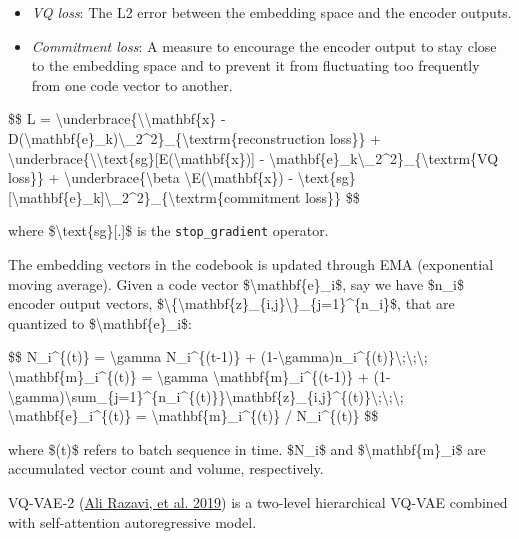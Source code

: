 \begin{itemize}
\tightlist
\item
  \emph{VQ loss}: The L2 error between the embedding space and the encoder outputs.
\item
  \emph{Commitment loss}: A measure to encourage the encoder output to stay close to the embedding space and to prevent it from fluctuating too frequently from one code vector to another.
\end{itemize}

\$\$ L = \textbackslash underbrace\{\textbackslash\textbar\textbackslash mathbf\{x\} - D(\textbackslash mathbf\{e\}\_k)\textbackslash\textbar\_2\^{}2\}\_\{\textbackslash textrm\{reconstruction loss\}\} + \textbackslash underbrace\{\textbackslash\textbar\textbackslash text\{sg\}{[}E(\textbackslash mathbf\{x\}){]} - \textbackslash mathbf\{e\}\_k\textbackslash\textbar\_2\^{}2\}\_\{\textbackslash textrm\{VQ loss\}\} + \textbackslash underbrace\{\textbackslash beta \textbackslash\textbar E(\textbackslash mathbf\{x\}) - \textbackslash text\{sg\}{[}\textbackslash mathbf\{e\}\_k{]}\textbackslash\textbar\_2\^{}2\}\_\{\textbackslash textrm\{commitment loss\}\} \$\$

where \$\textbackslash text\{sg\}{[}.{]}\$ is the \texttt{stop\_gradient} operator.

The embedding vectors in the codebook is updated through EMA (exponential moving average). Given a code vector \$\textbackslash mathbf\{e\}\_i\$, say we have \$n\_i\$ encoder output vectors, \$\textbackslash\{\textbackslash mathbf\{z\}\_\{i,j\}\textbackslash\}\_\{j=1\}\^{}\{n\_i\}\$, that are quantized to \$\textbackslash mathbf\{e\}\_i\$:

\$\$ N\_i\^{}\{(t)\} = \textbackslash gamma N\_i\^{}\{(t-1)\} + (1-\textbackslash gamma)n\_i\^{}\{(t)\}\textbackslash;\textbackslash;\textbackslash; \textbackslash mathbf\{m\}\_i\^{}\{(t)\} = \textbackslash gamma \textbackslash mathbf\{m\}\_i\^{}\{(t-1)\} + (1-\textbackslash gamma)\textbackslash sum\_\{j=1\}\^{}\{n\_i\^{}\{(t)\}\}\textbackslash mathbf\{z\}\_\{i,j\}\^{}\{(t)\}\textbackslash;\textbackslash;\textbackslash; \textbackslash mathbf\{e\}\_i\^{}\{(t)\} = \textbackslash mathbf\{m\}\_i\^{}\{(t)\} / N\_i\^{}\{(t)\} \$\$

where \$(t)\$ refers to batch sequence in time. \$N\_i\$ and \$\textbackslash mathbf\{m\}\_i\$ are accumulated vector count and volume, respectively.

VQ-VAE-2 (\href{https://arxiv.org/abs/1906.00446}{Ali Razavi, et al. 2019}) is a two-level hierarchical VQ-VAE combined with self-attention autoregressive model.


